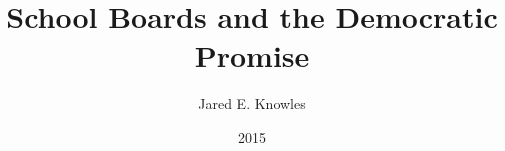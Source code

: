 \documentclass[12pt,oneside,letterpaper]{memoir}
\title{School Boards and the Democratic Promise}
\author{Jared E. Knowles}
\date{2015}
\begin{document}
\maketitle












% 

\begin{appendices}


\end{appendices}

\begin{colophon}

\end{colophon}

% 

% 
% 

\end{document}
